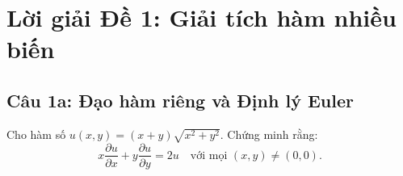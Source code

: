 ﻿%

\section*{Lời giải Đề 1: Giải tích hàm nhiều biến}

\subsection*{Câu 1a: Đạo hàm riêng và Định lý Euler}

\begin{questionbox}
Cho hàm số $u(x, y) = (x + y)\sqrt{x^2 + y^2}$. Chứng minh rằng: 
\[
    x\dfrac{\partial u}{\partial x} + y\dfrac{\partial u}{\partial y} = 2u 
    \quad \text{với mọi } (x, y) \neq (0,0).
\]
\end{questionbox}

